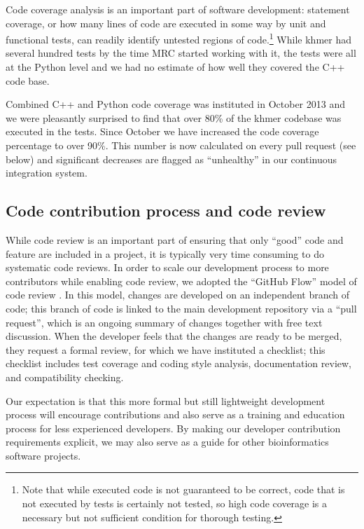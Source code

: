 \documentclass[11pt]{article}
\begin{document}
Code coverage analysis is an important part of software development:
statement coverage, or how many lines of code are executed in some way
by unit and functional tests, can readily identify untested regions of
code.\footnote{Note that while executed code is not guaranteed to be
  correct, code that is not executed by tests is certainly not tested,
  so high code coverage is a necessary but not sufficient condition
  for thorough testing.}  While khmer had several hundred tests by the
time MRC started working with it, the tests were all at the Python
level and we had no estimate of how well they covered the C++ code
base.

Combined C++ and Python code coverage was instituted in October 2013
and we were pleasantly surprised to find that over 80\% of the khmer
codebase was executed in the tests.  Since October we have increased
the code coverage percentage to over 90\%. This number is now
calculated on every pull request (see below) and significant decreases
are flagged as ``unhealthy'' in our continuous integration system.

\subsection{Code contribution process and code review}

While code review is an important part of ensuring that only ``good''
code and feature are included in a project, it is typically very time
consuming to do systematic code reviews.  In order to scale our
development process to more contributors while enabling code review,
we adopted the ``GitHub Flow'' model of code review \cite{GitHubFlow}.
In this model, changes are developed on an independent branch
of code; this branch of code is linked to the main development
repository via a ``pull request'', which is an ongoing summary of
changes together with free text discussion.  When the developer feels
that the changes are ready to be merged, they request a formal review,
for which we have instituted a checklist; this checklist includes test
coverage and coding style analysis, documentation review, and
compatibility checking.

Our expectation is that this more formal but still lightweight
development process will encourage contributions and also serve as a
training and education process for less experienced developers.  By
making our developer contribution requirements explicit, we may also
serve as a guide for other bioinformatics software projects.
\end{document}
